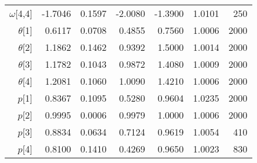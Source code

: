 \documentclass[11pt]{article}
\begin{document}
\begin{table}[ht]
\begin{tabular}{rrrrrrr}
      $\omega$[4,4] & -1.7046 & 0.1597 & -2.0080 & -1.3900 & 1.0101 &   250 \\ 
     $\theta$[1] & 0.6117 & 0.0708 & 0.4855 & 0.7560 & 1.0006 &  2000 \\ 
     $\theta$[2] & 1.1862 & 0.1462 & 0.9392 & 1.5000 & 1.0014 &  2000 \\ 
     $\theta$[3] & 1.1782 & 0.1043 & 0.9872 & 1.4080 & 1.0009 &  2000 \\ 
     $\theta$[4] & 1.2081 & 0.1060 & 1.0090 & 1.4210 & 1.0006 &  2000 \\ 
     $p$[1] & 0.8367 & 0.1095 & 0.5280 & 0.9604 & 1.0235 &  2000 \\ 
     $p$[2] & 0.9995 & 0.0006 & 0.9979 & 1.0000 & 1.0006 &  2000 \\ 
     $p$[3] & 0.8834 & 0.0634 & 0.7124 & 0.9619 & 1.0054 &   410 \\ 
     $p$[4] & 0.8100 & 0.1410 & 0.4269 & 0.9650 & 1.0023 &   830 \\ 
      \hline
\end{tabular}
\end{table}
\end{document}
